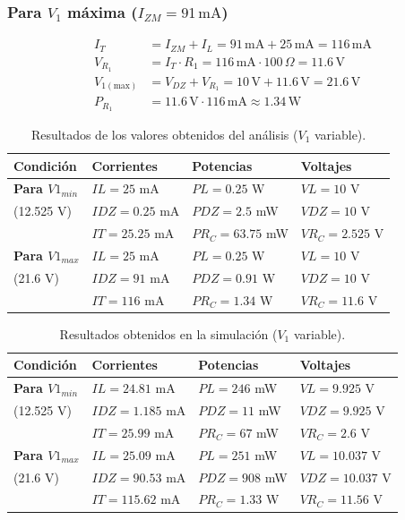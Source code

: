 \documentclass[journal]{IEEEtran}
\begin{document}
\subsubsection{Para $V_1$ máxima ($I_{ZM} = 91\,\text{mA}$)}

\begin{align*}
I_T &= I_{ZM} + I_L = 91\,\text{mA} + 25\,\text{mA} = 116\,\text{mA} \\
V_{R_1} &= I_T \cdot R_1 = 116\,\text{mA} \cdot 100\,\Omega = 11.6\,\text{V} \\
V_{1(\text{max})} &= V_{DZ} + V_{R_1} 
= 10\,\text{V} + 11.6\,\text{V} = 21.6\,\text{V} \\
P_{R_1} &= 11.6\,\text{V} \cdot 116\,\text{mA} 
\approx 1.34\,\text{W}
\end{align*}

\begin{table}[H]
\centering
\begin{tabularx}{\columnwidth}{|X|X|X|X|}
\hline
\textbf{Condición} & \textbf{Corrientes} & \textbf{Potencias} & \textbf{Voltajes}\\ \hline
\textbf{Para $V1_{min}$} & $IL=25$ mA & $PL=0.25$ W & $VL=10$ V \\ 
(12.525 V) & $IDZ=0.25$ mA & $PDZ=2.5$ mW & $VDZ=10$ V \\ 
& $IT=25.25$ mA & $PR_{C}=63.75$ mW & $VR_{C}=2.525$ V \\ \hline
\textbf{Para $V1_{max}$} & $IL=25$ mA & $PL=0.25$ W & $VL=10$ V \\ 
(21.6 V) & $IDZ=91$ mA & $PDZ=0.91$ W & $VDZ=10$ V \\ 
& $IT=116$ mA & $PR_{C}=1.34$ W & $VR_{C}=11.6$ V \\ \hline
\end{tabularx}
\caption{Resultados de los valores obtenidos del análisis ($V_1$ variable).}
\label{tablaAnalisisV1}
\end{table}

\begin{table}[H]
\centering
\begin{tabularx}{\columnwidth}{|X|X|X|X|}
\hline
\textbf{Condición} & \textbf{Corrientes} & \textbf{Potencias} & \textbf{Voltajes}\\ \hline
\textbf{Para $V1_{min}$} & $IL=24.81$ mA & $PL=246$ mW & $VL=9.925$ V \\ 
(12.525 V) & $IDZ=1.185$ mA & $PDZ=11$ mW & $VDZ=9.925$ V \\ 
& $IT=25.99$ mA & $PR_{C}=67$ mW & $VR_{C}=2.6$ V \\ \hline
\textbf{Para $V1_{max}$} & $IL=25.09$ mA & $PL=251$ mW & $VL=10.037$ V \\ 
(21.6 V) & $IDZ=90.53$ mA & $PDZ=908$ mW & $VDZ=10.037$ V \\ 
& $IT=115.62$ mA & $PR_{C}=1.33$ W & $VR_{C}=11.56$ V \\ \hline
\end{tabularx}
\caption{Resultados obtenidos en la simulación ($V_1$ variable).}
\label{tablaSimulacionV1}
\end{table}
\end{document}
